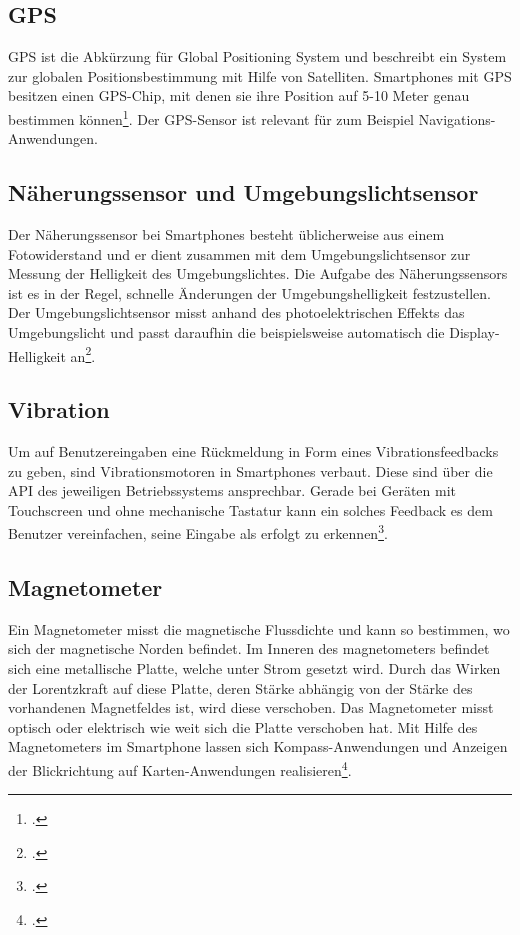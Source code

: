 \subsection{GPS}

GPS ist die Abkürzung für Global Positioning System und beschreibt ein System zur globalen Positionsbestimmung mit Hilfe von Satelliten. Smartphones mit GPS besitzen einen GPS-Chip, mit denen sie ihre Position auf 5-10 Meter genau bestimmen können\footcite{AndroidWiki}. Der GPS-Sensor ist relevant für zum Beispiel Navigations-Anwendungen. 

\subsection{Näherungssensor und Umgebungslichtsensor}

Der Näherungssensor bei Smartphones besteht üblicherweise aus einem Fotowiderstand und er dient zusammen mit dem Umgebungslichtsensor zur Messung der Helligkeit des Umgebungslichtes. Die Aufgabe des Näherungssensors ist es in der Regel, schnelle Änderungen der Umgebungshelligkeit festzustellen. Der Umgebungslichtsensor misst anhand des photoelektrischen Effekts das Umgebungslicht und passt daraufhin die beispielsweise automatisch die Display-Helligkeit an\footcite{AndroidWiki}. 

\subsection{Vibration}

Um auf Benutzereingaben eine Rückmeldung in Form eines Vibrationsfeedbacks zu geben, sind Vibrationsmotoren in Smartphones verbaut. Diese sind über die API des jeweiligen Betriebssystems ansprechbar. Gerade bei Geräten mit Touchscreen und ohne mechanische Tastatur kann ein solches Feedback es dem Benutzer vereinfachen, seine Eingabe als erfolgt zu erkennen\footcite{AndroidWiki}. 

\subsection{Magnetometer}

Ein  Magnetometer misst die magnetische Flussdichte und kann so bestimmen, wo sich der magnetische Norden befindet. Im Inneren des magnetometers befindet sich eine metallische Platte, welche unter Strom gesetzt wird. Durch das Wirken der Lorentzkraft auf diese Platte, deren Stärke abhängig von der Stärke des vorhandenen Magnetfeldes ist, wird diese verschoben. Das Magnetometer misst optisch oder elektrisch wie weit sich die Platte verschoben hat. Mit Hilfe des Magnetometers im Smartphone lassen sich Kompass-Anwendungen und Anzeigen der Blickrichtung auf Karten-Anwendungen realisieren\footcite{AndroidMag}. 